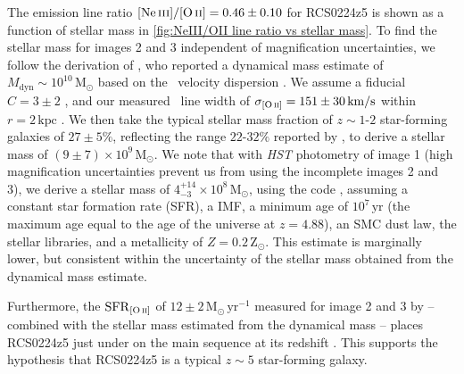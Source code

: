 The emission line ratio $\NeIII/\OII = 0.46 \pm 0.10$ for RCS0224z5 is shown as a function of stellar mass in \cref{fig:NeIII/OII line ratio vs stellar mass}. To find the stellar mass for images 2 and 3 independent of magnification uncertainties, we follow the derivation of \citet{2007MNRAS.376..479S}, who reported a dynamical mass estimate of $M_\text{dyn} \sim 10^{10} \, \mathrm{M}_\odot$ based on the \OII\ velocity dispersion \citep[via Equation (1) in][]{2006ApJ...646..107E}. We assume a fiducial $C = 3 \pm 2$ \citep[with high uncertainty to reflect the range of possible values depending on mass distribution and velocity field, see][]{2006ApJ...646..107E}, and our measured \OII\ line width of $\sigma_\OII = 151 \pm 30 \, \mathrm{km/s}$ within $r = 2 \, \mathrm{kpc}$ \citep[following][]{2007MNRAS.376..479S}. We then take the typical stellar mass fraction of $z \sim 1$-$2$ star-forming galaxies of $27 \pm 5\%$, reflecting the range $22$-$32\%$ reported by \citet[; see also \citealt{2016ApJ...831..149W}]{2016MNRAS.457.1888S}, to derive a stellar mass of $(9 \pm 7) \times 10^{9} \, \mathrm{M}_\odot$. We note that with \textit{HST} photometry of image 1 (high magnification uncertainties prevent us from using the incomplete images 2 and 3), we derive a stellar mass of $4_{-3}^{+14} \times 10^8 \, \mathrm{M_\odot}$, using the  code \citep{2009ApJ...700..221K}, assuming a constant star formation rate (SFR), a \citet{2003PASP..115..763C} IMF, a minimum age of $10^7 \, \mathrm{yr}$ (the maximum age equal to the age of the universe at $z = 4.88$), an SMC dust law, the \citet{2003MNRAS.344.1000B} stellar libraries, and a metallicity of $Z = 0.2 \, \mathrm{Z_\odot}$. This estimate is marginally lower, but consistent within the uncertainty of the stellar mass obtained from the dynamical mass estimate.

Furthermore, the $\mathrm{SFR}_\OII$ of $12 \pm 2 \, \mathrm{M_\odot \, yr^{-1}}$ measured for image 2 and 3 by \citet{2007MNRAS.376..479S} -- combined with the stellar mass estimated from the dynamical mass -- places RCS0224z5 just under on the main sequence at its redshift \citep[e.g.][; a lower stellar mass, as suggested by the SED modelling, would shift it onto the main sequence]{2015ApJ...799..183S}. This supports the hypothesis that RCS0224z5 is a typical $z \sim 5$ star-forming galaxy.

